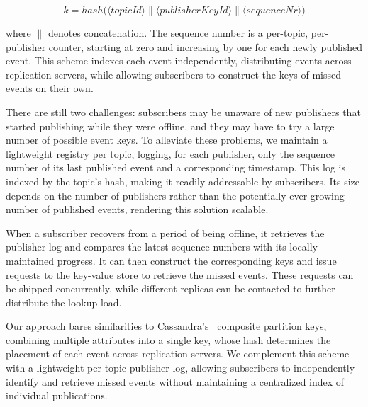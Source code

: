 \[
    k = hash\big(
        \langle topicId \rangle \parallel
        \langle publisherKeyId \rangle \parallel
        \langle sequenceNr \rangle
    \big)
\]

where $\parallel$ denotes concatenation. 
The sequence number is a per-topic, per-publisher counter, starting at zero and increasing by one for each newly published event.
This scheme indexes each event independently, distributing events across replication servers, while allowing subscribers to construct the keys of missed events on their own.

There are still two challenges: subscribers may be unaware of new publishers that started publishing while they were offline, and they may have to try a large number of possible event keys.
To alleviate these problems, we maintain a lightweight registry per topic, logging, for each publisher, only the sequence number of its last published event and a corresponding timestamp. 
This log is indexed by the topic's hash, making it readily addressable by subscribers. 
Its size depends on the number of publishers rather than the potentially ever-growing number of published events, rendering this solution scalable.

When a subscriber recovers from a period of being offline, it retrieves the publisher log and compares the latest sequence numbers with its locally maintained progress.
It can then construct the corresponding keys and issue requests to the key-value store to retrieve the missed events. 
These requests can be shipped concurrently, while different replicas can be contacted to further distribute the lookup load.

Our approach bares similarities to Cassandra's~\cite{Cassandra} composite partition keys, combining multiple attributes into a single key, whose hash determines the placement of each event across replication servers.
We complement this scheme with a lightweight per-topic publisher log, allowing subscribers to independently identify and retrieve missed events without maintaining a centralized index of individual publications.